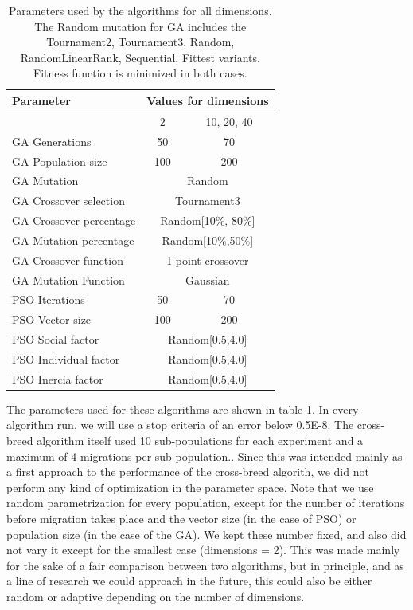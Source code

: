 \documentclass[runningheads]{llncs}
\begin{document}
   \begin{table}[h!tp]
    \caption{Parameters used by the algorithms for all dimensions. The Random mutation for GA includes the Tournament2, Tournament3, Random, RandomLinearRank, Sequential, Fittest variants. Fitness function is minimized in both cases.}
    \label{table:ga-pso-parameters}
    \centering
    \begin{tabular}{|l|c|c|}
    \hline
    Parameter & \multicolumn{2}{c|}{Values for dimensions} \\
      \hline
      & 2 & 10, 20, 40 \\
    \hline
    GA Generations & 50 &  70\\
    \hline
     GA Population size & 100 & 200\\
    \hline
    GA Mutation &  \multicolumn{2}{c|}{Random}\\
    \hline
    GA Crossover selection & \multicolumn{2}{c|}{Tournament3} \\
    \hline
    GA Crossover percentage & \multicolumn{2}{c|}{Random[10\%, 80\%]} \\
    \hline
    GA Mutation percentage & \multicolumn{2}{c|}{Random[10\%,50\%]} \\
    \hline
    GA Crossover function & \multicolumn{2}{c|}{1 point crossover} \\
    \hline
    GA Mutation Function & \multicolumn{2}{c|}{Gaussian} \\
      \hline 
      \hline
    PSO Iterations & 50 & 70\\
    \hline
    PSO Vector size & 100 & 200\\
    \hline
    PSO Social factor & \multicolumn{2}{c|}{Random[0.5,4.0]} \\
    \hline
    PSO Individual factor & \multicolumn{2}{c|}{Random[0.5,4.0]} \\
    \hline
    PSO Inercia factor & \multicolumn{2}{c|}{Random[0.5,4.0]} \\
    \hline
    \end{tabular}
\end{table}

The parameters used for these algorithms are shown in table
\ref{table:ga-pso-parameters}. In every algorithm run, we will use  a
stop criteria of an error below 0.5E-8. The cross-breed algorithm
itself used 10 sub-populations for each
experiment and a maximum of 4 migrations per sub-population..
Since this was intended mainly
as a first approach to the performance of the cross-breed algorith, we
did not perform any kind of optimization in the parameter space. Note
that we use random parametrization for every population, except for
the number of iterations before migration takes place and the vector
size (in the case of PSO) %
or population size (in the case of the GA). We kept these number
fixed, and also did not vary it except for the smallest case
(dimensions = 2). This was made mainly for the sake of a fair
comparison between two algorithms, but in principle, and as a line of
research we could approach in the future, this could also be either
random or adaptive depending on the number of dimensions.
\end{document}
